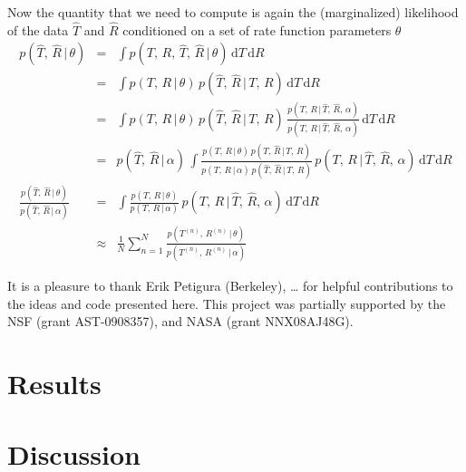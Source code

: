 \documentclass[12pt,preprint]{aastex}
\newcommand{\dd}{\ensuremath{\,\mathrm{d}}}
\newcommand{\ratepars}{\ensuremath{\theta}}
\newcommand{\obs}[1]{\ensuremath{\hat{#1}}}
\newcommand{\radius}{\ensuremath{R}}
\newcommand{\period}{\ensuremath{T}}
\newcommand{\interim}{\ensuremath{\alpha}}
\begin{document}
Now the quantity that we need to compute is again the (marginalized)
likelihood of the data $\obs{\period}$ and $\obs{\radius}$ conditioned on a
set of rate function parameters \ratepars
\begin{eqnarray}
p(\obs{\period},\,\obs{\radius}\,|\,\ratepars) &=&
\int p(\period,\,\radius,\,\obs{\period},\,\obs{\radius}\,|\,\ratepars)
\dd\period\dd\radius \\
&=&
\int p(\period,\,\radius\,|\,\ratepars) \,
p(\obs{\period},\,\obs{\radius}\,|\,\period,\,\radius)
\dd\period\dd\radius \\
&=&
\int p(\period,\,\radius\,|\,\ratepars) \,
p(\obs{\period},\,\obs{\radius}\,|\,\period,\,\radius)\,
\frac{p(\period,\,\radius\,|\,\obs{\period},\,\obs{\radius},\,\interim)}
     {p(\period,\,\radius\,|\,\obs{\period},\,\obs{\radius},\,\interim)}
\dd\period\dd\radius \\
&=&
p(\obs{\period},\,\obs{\radius}\,|\,\interim)\,
\int
\frac{p(\period,\,\radius\,|\,\ratepars) \,
      p(\obs{\period},\,\obs{\radius}\,|\,\period,\,\radius)}
     {p(\period,\,\radius\,|\,\interim) \,
      p(\obs{\period},\,\obs{\radius}\,|\,\period,\,\radius)}\,
p(\period,\,\radius\,|\,\obs{\period},\,\obs{\radius},\,\interim)
\dd\period\dd\radius \\
\frac{p(\obs{\period},\,\obs{\radius}\,|\,\ratepars)}
     {p(\obs{\period},\,\obs{\radius}\,|\,\interim)}
&=&
\int
\frac{p(\period,\,\radius\,|\,\ratepars)}
     {p(\period,\,\radius\,|\,\interim)} \,
p(\period,\,\radius\,|\,\obs{\period},\,\obs{\radius},\,\interim)
\dd\period\dd\radius \\
&\approx&
\frac{1}{N}
\sum_{n=1}^N
\frac{p(\period^{(n)},\,\radius^{(n)}\,|\,\ratepars)}
     {p(\period^{(n)},\,\radius^{(n)}\,|\,\interim)}
\end{eqnarray}

\acknowledgments
It is a pleasure to thank
    Erik Petigura (Berkeley),
    \ldots
for helpful contributions to the ideas and code presented here.
This project was partially supported by the NSF (grant AST-0908357), and NASA
(grant NNX08AJ48G).

\section{Results}

\section{Discussion}
\end{document}
